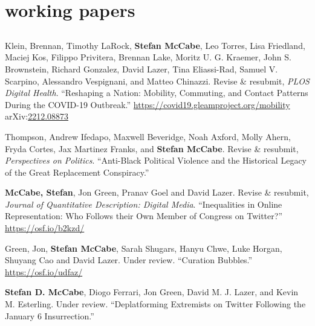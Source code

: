 \documentclass[11pt, letter]{article}
\begin{document}
\section{working papers}
\subsection*{} %
\vspace{-6mm} %
\begin{hangparas}{.25in}{1}

Klein, Brennan,\textsuperscript{\textdagger} Timothy LaRock,\textsuperscript{\textdagger} \textbf{Stefan McCabe},\textsuperscript{\textdagger} Leo Torres,\textsuperscript{\textdagger} Lisa Friedland, Maciej Kos, Filippo Privitera, Brennan Lake, Moritz U. G. Kraemer, John S. Brownstein, Richard Gonzalez, David Lazer, Tina Eliassi-Rad, Samuel V. Scarpino, Alessandro Vespignani, and Matteo Chinazzi. Revise \& resubmit, \textit{PLOS Digital Health}. ``Reshaping a Nation: Mobility, Commuting, and Contact Patterns During the COVID-19 Outbreak.'' \href{https://covid19.gleamproject.org/mobility}{https://covid19.gleamproject.org/mobility} arXiv:\href{https://arxiv.org/abs/2212.08873}{2212.08873}\vspace{2mm}

Thompson, Andrew Ifedapo, Maxwell Beveridge, Noah Axford, Molly Ahern, Fryda Cortes, Jax Martinez Franks, and \textbf{Stefan McCabe}. Revise \& resubmit, \textit{Perspectives on Politics}. ``Anti-Black Political Violence and the Historical Legacy of the Great Replacement Conspiracy.'' \vspace{2mm}

\textbf{McCabe, Stefan}, Jon Green, Pranav Goel and David Lazer. Revise \& resubmit, \textit{Journal of Quantitative Description: Digital Media}. ``Inequalities in Online Representation: Who Follows their Own Member of Congress on Twitter?'' \href{https://osf.io/b2kzd/}{https://osf.io/b2kzd/}\vspace{2mm}

Green, Jon,\textsuperscript{\textdagger} \textbf{Stefan McCabe},\textsuperscript{\textdagger} Sarah Shugars, Hanyu Chwe, Luke Horgan, Shuyang Cao and David Lazer. Under review. ``Curation Bubbles.'' \href{https://osf.io/udfaz/}{https://osf.io/udfaz/} \vspace{2mm}

\textbf{Stefan D. McCabe},\textsuperscript{\textdagger} Diogo Ferrari,\textsuperscript{\textdagger} Jon Green, David M. J. Lazer, and Kevin M. Esterling. Under review. ``Deplatforming Extremists on Twitter Following the January 6 Insurrection.''\vspace{2mm}


\end{hangparas}
\end{document}
